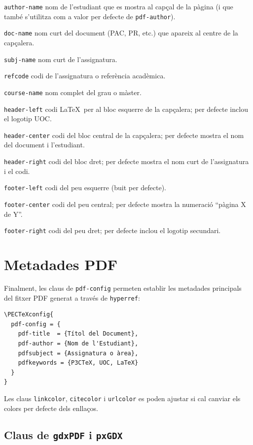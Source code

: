 \documentclass[11pt,a4paper]{article}
\begin{document}
\begin{description}
  \item{\verb|author-name|} nom de l'estudiant que es mostra al
    capçal de la pàgina (i que també s'utilitza com a valor per
    defecte de \verb|pdf-author|).
  \item{\verb|doc-name|} nom curt del document (PAC, PR, etc.) que
    apareix al centre de la capçalera.
  \item{\verb|subj-name|} nom curt de l'assignatura.
  \item{\verb|refcode|} codi de l'assignatura o referència acadèmica.
  \item{\verb|course-name|} nom complet del grau o màster.
  \item{\verb|header-left|} codi \LaTeX\ per al bloc esquerre de la
    capçalera; per defecte inclou el logotip UOC.
  \item{\verb|header-center|} codi del bloc central de la capçalera;
    per defecte mostra el nom del document i l'estudiant.
  \item{\verb|header-right|} codi del bloc dret; per defecte mostra el
    nom curt de l'assignatura i el codi.
  \item{\verb|footer-left|} codi del peu esquerre (buit per defecte).
  \item{\verb|footer-center|} codi del peu central; per defecte mostra
    la numeració ``pàgina X de Y''.
  \item{\verb|footer-right|} codi del peu dret; per defecte inclou el
    logotip secundari.
\end{description}

\section{Metadades PDF}

Finalment, les claus de \verb|pdf-config| permeten establir les
metadades principals del fitxer PDF generat a través de
\texttt{hyperref}:
\begin{verbatim}
\PECTeXconfig{
  pdf-config = {
    pdf-title  = {Títol del Document},
    pdf-author = {Nom de l'Estudiant},
    pdfsubject = {Assignatura o àrea},
    pdfkeywords = {P3CTeX, UOC, LaTeX}
  }
}
\end{verbatim}

Les claus \verb|linkcolor|, \verb|citecolor| i \verb|urlcolor| es poden
ajustar si cal canviar els colors per defecte dels enllaços.

\subsection*{Claus de \texttt{gdxPDF} i \texttt{pxGDX}}
\end{document}
